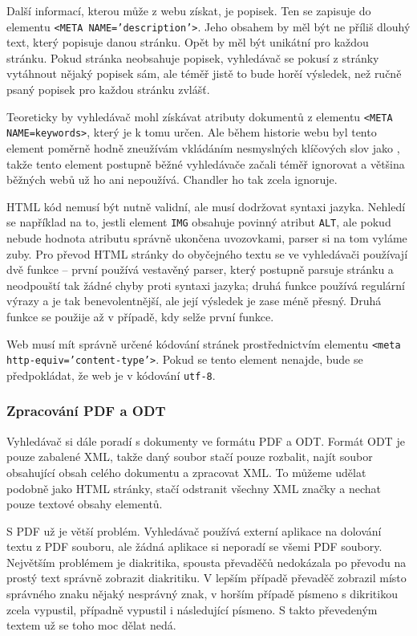 \documentclass[12pt]{article}
\newcommand{\name}{Chandler}
\newcommand{\code}[1]{\texttt{#1}}
\newcommand{\sssection}[1]{\subsubsection{#1}}
\begin{document}
Další informací, kterou může z webu získat, je popisek. Ten se zapisuje do elementu \code{<META NAME='description'>}. Jeho obsahem by měl být ne příliš dlouhý text, který popisuje danou stránku. Opět by měl být unikátní pro každou stránku. Pokud stránka neobsahuje popisek, vyhledávač se pokusí z stránky vytáhnout nějaký popisek sám, ale téměř jistě to bude horěí výsledek, než ručně psaný popisek pro každou stránku zvlášť. 

Teoreticky by vyhledávač mohl získávat atributy dokumentů z elementu \code{<META NAME=keywords>}, který je k tomu určen. Ale během historie webu byl tento element poměrně hodně zneužívám vkládáním nesmyslných klíčových slov jako , takže tento element postupně běžné vyhledávače začali téměř ignorovat a většina běžných webů už ho ani nepoužívá. \name{} ho tak zcela ignoruje. 

HTML kód nemusí být nutně validní, ale musí dodržovat syntaxi jazyka. Nehledí se například na to, jestli element \code{IMG} obsahuje povinný atribut \code{ALT}, ale pokud nebude hodnota atributu správně ukončena uvozovkami, parser si na tom vyláme zuby. Pro převod HTML stránky do obyčejného textu se ve vyhledávači používají dvě funkce -- první používá vestavěný parser, který postupně parsuje stránku a neodpouští tak žádné chyby proti syntaxi jazyka; druhá funkce používá regulární výrazy a je tak benevolentnější, ale její výsledek je zase méně přesný. Druhá funkce se použije až v případě, kdy selže první funkce.

Web musí mít správně určené kódování stránek prostřednictvím elementu \code{<meta http-equiv='content-type'>}. Pokud se tento element nenajde, bude se předpokládat, že web je v kódování \code{utf-8}. 

\sssection{Zpracování PDF a ODT}
Vyhledávač si dále poradí s dokumenty ve formátu PDF a ODT. Formát ODT je pouze zabalené XML, takže daný soubor stačí pouze rozbalit, najít soubor obsahující obsah celého dokumentu a zpracovat XML. To můžeme udělat podobně jako HTML stránky, stačí odstranit všechny XML značky a nechat pouze textové obsahy elementů. 

S PDF už je větší problém. Vyhledávač používá externí aplikace na dolování textu z PDF souboru, ale žádná aplikace si neporadí se všemi PDF soubory. Největším problémem je diakritika, spousta převaděčů nedokázala po převodu na prostý text správně zobrazit diakritiku. V lepším případě převaděč zobrazil místo správného znaku nějaký nesprávný znak, v horším případě písmeno s dikritikou zcela vypustil, případně vypustil i následující písmeno. S takto převedeným textem už se toho moc dělat nedá. 
\end{document}
